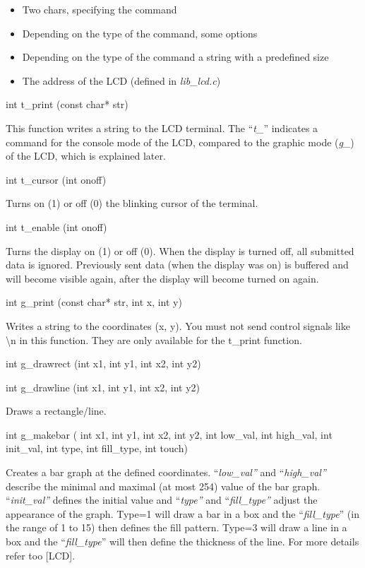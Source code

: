 \documentclass[
]{article}
\begin{document}
\begin{itemize}
\item
  Two chars, specifying the command
\item
  Depending on the type of the command, some options
\item
  Depending on the type of the command a string with a predefined size
\item
  The address of the LCD (defined in \emph{lib\_lcd.c})
\end{itemize}

int t\_print (const char* str)

This function writes a string to the LCD terminal. The ``\emph{t\_}''
indicates a command for the console mode of the LCD, compared to the
graphic mode (\emph{g\_}) of the LCD, which is explained later.

int t\_cursor (int onoff)

Turns on (1) or off (0) the blinking cursor of the terminal.

int t\_enable (int onoff)

Turns the display on (1) or off (0). When the display is turned off, all
submitted data is ignored. Previously sent data (when the display was
on) is buffered and will become visible again, after the display will
become turned on again.

int g\_print (const char* str, int x, int y)

Writes a string to the coordinates (x, y). You must not send control
signals like \textbackslash n in this function. They are only available
for the t\_print function.

int g\_drawrect (int x1, int y1, int x2, int y2)

int g\_drawline (int x1, int y1, int x2, int y2)

Draws a rectangle/line.

int g\_makebar ( int x1, int y1, int x2, int y2, int low\_val, int
high\_val, int init\_val, int type, int fill\_type, int touch)

Creates a bar graph at the defined coordinates. ``\emph{low\_val''} and
``\emph{high\_val''} describe the minimal and maximal (at most 254)
value of the bar graph. ``\emph{init\_val''} defines the initial value
and ``\emph{type''} and ``\emph{fill\_type''} adjust the appearance of
the graph. Type=1 will draw a bar in a box and the ``\emph{fill\_type}''
(in the range of 1 to 15) then defines the fill pattern. Type=3 will
draw a line in a box and the ``\emph{fill\_type}'' will then define the
thickness of the line. For more details refer too {[}LCD{]}.
\end{document}
